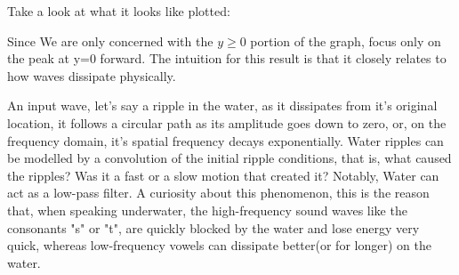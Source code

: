 \documentclass[12pt]{article}
\begin{document}
Take a look at what it looks like plotted:
\begin{figure}[H]
    \centering
{}
\end{figure}

Since We are only concerned with the \(y\geq 0\) portion of the graph, focus only on the peak at y=0 forward. The intuition for this result is that it closely relates to how waves dissipate physically.
\begin{figure}[H]
\end{figure}
An input wave, let's say a ripple in the water, as it dissipates from it's original location, it follows a circular path as its amplitude goes down to zero, or, on the frequency domain, it's spatial frequency decays exponentially.
Water ripples can be modelled by a convolution of the initial ripple conditions, that is, what caused the ripples? Was it a fast or a slow motion that created it? Notably, Water can act as a low-pass filter.
\newline
A curiosity about this phenomenon, this is the reason that, when speaking underwater, the high-frequency sound waves like the consonants "s" or "t", are quickly blocked by the water and lose energy very quick, whereas low-frequency vowels can dissipate better(or for longer) on the water.
\end{document}
